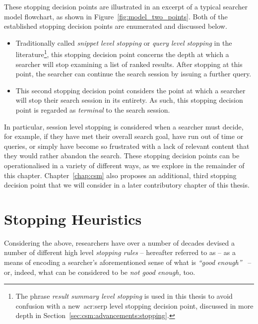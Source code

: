 These stopping decision points are illustrated in an excerpt of a typical searcher model flowchart, as shown in Figure~\ref{fig:model_two_points}. Both of the established stopping decision points are enumerated and discussed below.

\vspace*{-4mm}
\begin{itemize}
    \item[\blueboxbold{1}]{ Traditionally called \emph{snippet level stopping} or \emph{query level stopping} in the literature\footnote{The phrase \emph{result summary level stopping} is used in this thesis to avoid confusion with a new~\gls{acr:serp} level stopping decision point, discussed in more depth in Section~\ref{sec:csm:advancements:stopping}.}, this stopping decision point concerns the depth at which a searcher will stop examining a list of ranked results. After stopping at this point, the searcher can continue the search session by issuing a further query.}
    \item[\blueboxbold{2}]{ This second stopping decision point considers the point at which a searcher will stop their search session in its entirety. As such, this stopping decision point is regarded as \emph{terminal} to the search session.}
\end{itemize}
\vspace*{-4mm}

In particular, session level stopping is considered when a searcher must decide, for example, if they have met their overall search goal, have run out of time or queries, or simply have become so frustrated with a lack of relevant content that they would rather abandon the search. These stopping decision points can be operationalised in a variety of different ways, as we explore in the remainder of this chapter. Chapter~\ref{chap:csm} also proposes an additional, third stopping decision point that we will consider in a later contributory chapter of this thesis.

\section{Stopping Heuristics}\label{sec:stopping_background:heuristics}
Considering the above, researchers have over a number of decades devised a number of different high level \emph{stopping rules} -- hereafter referred to as  -- as a means of encoding a searcher's aforementioned sense of what is \emph{``good enough''}~\citep{zach2005enough_is_enough} -- or, indeed, what can be considered to be \emph{not good enough,} too.

